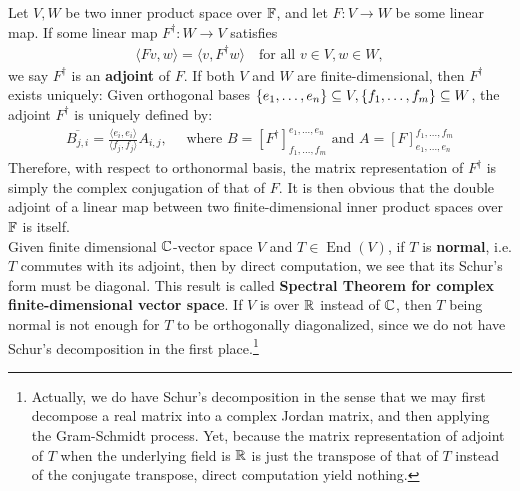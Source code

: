 \documentclass{report}
\begin{document}
Let $V,W$ be two inner product space over  $\mathbb{F}$, and let  $F:V\rightarrow W$ be some linear map. If some linear map $F^\dagger:W\rightarrow V$ satisfies 
\begin{align*}
\langle Fv,w\rangle = \langle v,F^\dagger w\rangle \quad\text{for all }v\in V,w\in W, 
\end{align*}
we say $F^\dagger $ is an  \textbf{adjoint} of $F$. If both $V$ and $W$ are finite-dimensional, then $F^\dagger $ exists uniquely: Given orthogonal bases $\left\{ e_1,\dots ,e_n \right\} \subseteq V,\left\{ f_1,\dots ,f_m \right\}\subseteq W$, the adjoint  $F^{\dagger }$ is uniquely defined by:  
\begin{align*}
\overline{B_{j,i}}= \frac{\langle e_i,e_i\rangle }{\langle f_j,f_j\rangle } A_{i,j},\quad \text{ where }B= [F^{\dagger }]_{f_1,\dots ,f_m}^{e_1,\dots ,e_n} \text{ and }A= [F]_{e_1,\dots ,e_n}^{f_1,\dots ,f_m}
\end{align*}
Therefore, with respect to orthonormal basis, the matrix representation of $F^{\dagger }$ is simply the complex conjugation of that of $F$. It is then obvious that the double adjoint of a linear map between two finite-dimensional inner product spaces over $\mathbb{F}$ is itself. \\

Given finite dimensional $\mathbb{C}$-vector space  $V$ and  $T \in \operatorname{End}(V)$, if $T$ is \textbf{normal}, i.e. $T$ commutes with its adjoint, then by direct computation, we see that its Schur's form must be diagonal. This result is called \textbf{Spectral Theorem for complex finite-dimensional vector space}. If $V$ is over $\mathbb{R}$ instead of  $\mathbb{C}$, then $T$ being normal is not enough for $T$ to be orthogonally diagonalized, since we do not have Schur's decomposition in the first place.\footnote{Actually, we do have Schur's decomposition in the sense that we may first decompose a real matrix into a complex Jordan matrix, and then applying the Gram-Schmidt process. Yet, because the matrix representation of adjoint of $T$ when the underlying field is  $\mathbb{R}$ is just the transpose of that of $T$ instead of  the conjugate transpose, direct computation yield nothing.} 
\end{document}
